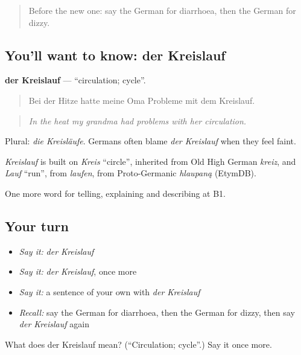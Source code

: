 \label{lesson:GE-C480-kreislauf}



\begin{quote}
Before the new one: say the German for diarrhoea, then the German for dizzy.
\end{quote}

\subsection*{You'll want to know: der Kreislauf}
\textbf{der Kreislauf} — \textquotedblleft{}circulation; cycle\textquotedblright{}.

\begin{quote}
Bei der Hitze hatte meine Oma Probleme mit dem Kreislauf.
\end{quote}

\begin{quote}
\emph{In the heat my grandma had problems with her circulation.}
\end{quote}

Plural: \emph{die Kreisläufe}. Germans often blame \emph{der Kreislauf} when they feel faint.

\begin{cousinweb}
\emph{Kreislauf} is built on \emph{Kreis} \textquotedblleft{}circle\textquotedblright{}, inherited from Old High German \emph{kreiz}, and \emph{Lauf} \textquotedblleft{}run\textquotedblright{}, from \emph{laufen}, from Proto-Germanic \emph{hlaupaną} (EtymDB).
\end{cousinweb}

\begin{grammarlens}[title={What you've built}]
One more word for telling, explaining and describing at B1.
\end{grammarlens}

\subsection*{Your turn}
\begin{itemize}
\raggedright
  \item \emph{Say it:} \emph{der Kreislauf}
  \item \emph{Say it:} \emph{der Kreislauf}, once more
  \item \emph{Say it:} a sentence of your own with \emph{der Kreislauf}
  \item \emph{Recall:} say the German for diarrhoea, then the German for dizzy, then say \emph{der Kreislauf} again
\end{itemize}

\begin{tcolorbox}[breakable,colback=teal!4,colframe=teal!35!black,title={Before you move on}]
What does der Kreislauf mean? (\textquotedblleft{}Circulation; cycle\textquotedblright{}.) Say it once more.
\end{tcolorbox}
